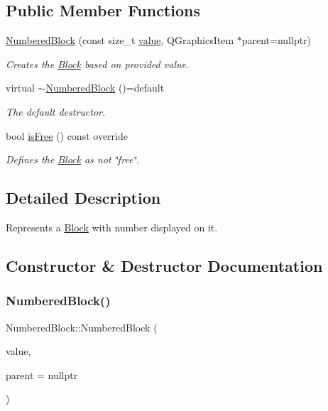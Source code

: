 \subsection*{Public Member Functions}
\begin{DoxyCompactItemize}
\item 
\mbox{\hyperlink{class_numbered_block_a4ca70b5e1ada6cebea98b8ecff25dcc7}{Numbered\+Block}} (const size\+\_\+t \mbox{\hyperlink{class_block_ab0b547f273f8d5e4e783ccedaf13ef26}{value}}, Q\+Graphics\+Item $\ast$parent=nullptr)
\begin{DoxyCompactList}\small\item\em Creates the \mbox{\hyperlink{class_block}{Block}} based on provided value. \end{DoxyCompactList}\item 
virtual \mbox{\hyperlink{class_numbered_block_aa7724b741079dbba2a507988bf669aaa}{$\sim$\+Numbered\+Block}} ()=default
\begin{DoxyCompactList}\small\item\em The default destructor. \end{DoxyCompactList}\item 
bool \mbox{\hyperlink{class_numbered_block_a04899b0e9d90f4ce4faa8aae9e4140e9}{is\+Free}} () const override
\begin{DoxyCompactList}\small\item\em Defines the \mbox{\hyperlink{class_block}{Block}} as not \char`\"{}free\char`\"{}. \end{DoxyCompactList}\end{DoxyCompactItemize}


\subsection{Detailed Description}
Represents a \mbox{\hyperlink{class_block}{Block}} with number displayed on it. 



\subsection{Constructor \& Destructor Documentation}
\mbox{\label{class_numbered_block_a4ca70b5e1ada6cebea98b8ecff25dcc7}} 
\subsubsection{\texorpdfstring{NumberedBlock()}{NumberedBlock()}}
{\footnotesize\ttfamily Numbered\+Block\+::\+Numbered\+Block (\begin{DoxyParamCaption}\item[{const size\+\_\+t}]{value,  }\item[{Q\+Graphics\+Item $\ast$}]{parent = {\ttfamily nullptr} }\end{DoxyParamCaption})\hspace{0.3cm}{\ttfamily [inline]}}



